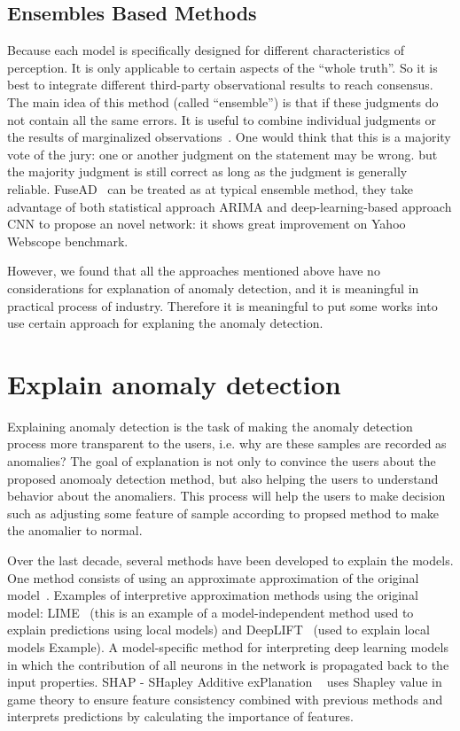\subsection{Ensembles Based Methods}

Because each model is specifically designed
for different characteristics of perception.
It is only applicable to certain aspects of
the ``whole truth''.
So it is best to integrate different
third-party observational results to reach consensus.
The main idea of this method (called ``ensemble'')
is that if these judgments do not contain all the same errors.
It is useful to combine individual judgments or
the results of marginalized observations~\cite{zhou2012ensemble}.
One would think that this is a majority vote of
the jury:
one or another judgment on the statement may be wrong.
but the majority judgment is still correct as long as
the judgment is generally reliable.
FuseAD~\cite{munir2019fusead} can be treated as
at typical ensemble method, 
they take advantage of both statistical approach ARIMA 
and deep-learning-based approach 
CNN to propose an novel network: 
it shows great improvement on Yahoo Webscope benchmark.

However, 
we found that all the approaches mentioned above 
have no considerations for explanation of anomaly detection, 
and it is meaningful in practical process of industry. 
Therefore it is meaningful to put some works into use 
certain approach for explaning the  anomaly detection.


\section{Explain anomaly detection}
\label{sec-explain_anomaly}
Explaining anomaly detection is the task of making
the anomaly detection process more transparent to the users,
i.e. why are these samples are recorded as anomalies?
The  goal of explanation is not only to
convince the users about the proposed anomoaly detection method,
but also helping the users to understand behavior about
the anomaliers.
This process will help the users to make decision such as
adjusting some feature of sample according to propsed method to
make the anomalier to normal.

Over the last decade,
several methods have been developed to explain the models.
One method consists of using an approximate approximation of 
the original model~\cite{lundberg2017unified}.
Examples of interpretive approximation methods using
the original model: 
LIME~\cite{ribeiro2016should} 
(this is an example of a model-independent method 
used to explain predictions using local models) and 
DeepLIFT~\cite{shrikumar2017learning} 
(used to explain local models Example).
A model-specific method for interpreting deep learning models 
in which the contribution of all neurons in the network is 
propagated back to the input properties.
SHAP - SHapley Additive exPlanation ~\cite{lundberg2017unified} uses 
Shapley value in game theory to ensure feature consistency combined
with previous methods and 
interprets predictions by calculating the importance of features.

